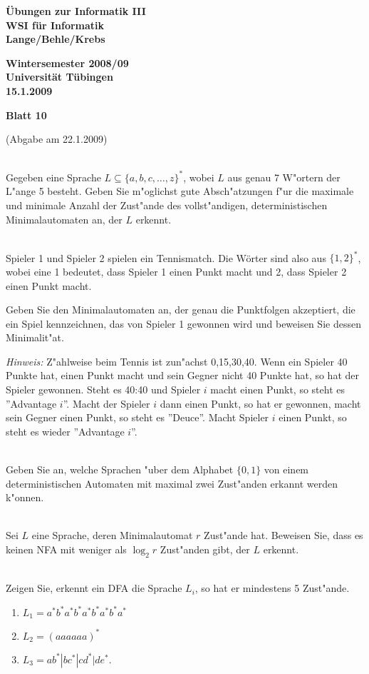 \documentclass[a4paper]{article}
\def\header#1#2#3{\pagestyle{empty}
\noindent
\begin{minipage}[t]{0.6\textwidth}
\begin{flushleft}
\bf \"Ubungen zur Informatik III\\
WSI f\"ur Informatik\\
Lange/Behle/Krebs
\end{flushleft}
\end{minipage}
\begin{minipage}[t]{0.4\textwidth}
\begin{flushright}
\bf Wintersemester 2008/09\\
Universit\"at T\"ubingen\\
#2 %
\end{flushright}
\end{minipage}

\begin{center}
{\Large\bf Blatt #1}

{(Abgabe am #3)}
\end{center}
\bigskip
}
\begin{document}
\header{10}{15.1.2009}{22.1.2009}

\bigskip
{}\\
Gegeben eine Sprache $L\subseteq\{a,b,c,\ldots,z\}^*$, wobei $L$ aus genau 7 W"ortern der L"ange 5 besteht. Geben Sie m"oglichst gute Absch"atzungen f"ur die maximale und minimale Anzahl der Zust"ande des vollst"andigen, deterministischen Minimalautomaten an, der $L$ erkennt.


\bigskip
{}\\
Spieler 1 und Spieler 2 spielen ein Tennismatch.
Die W\"orter sind also aus $\{1,2\}^*$, wobei eine 1 bedeutet, dass Spieler 1 einen Punkt macht und 2, dass Spieler 2 einen Punkt macht.

Geben Sie den Minimalautomaten an, der genau die Punktfolgen akzeptiert, die ein Spiel kennzeichnen, das von Spieler 1 gewonnen wird und beweisen Sie dessen Minimalit"at.

\bigskip
{\em Hinweis:} Z"ahlweise beim Tennis ist zun"achst 0,15,30,40. Wenn ein Spieler 40 Punkte hat, einen Punkt macht und sein Gegner nicht 40 Punkte hat, so hat der Spieler gewonnen. Steht es 40:40 und Spieler $i$ macht einen Punkt, so steht es ''Advantage $i$''. Macht der Spieler $i$ dann einen Punkt, so hat er gewonnen, macht sein Gegner einen Punkt, so steht es ''Deuce''. Macht Spieler $i$ einen Punkt, so steht es wieder ''Advantage $i$''.


\bigskip
{}\\
Geben Sie an, welche Sprachen "uber dem Alphabet $\{0,1\}$ von einem deterministischen Automaten mit maximal zwei Zust"anden erkannt werden k"onnen.

\bigskip
{}\\
Sei $L$ eine Sprache, deren Minimalautomat $r$ Zust"ande hat. Beweisen Sie, dass es keinen NFA mit weniger als $\log_2 r$ Zust"anden gibt, der $L$ erkennt.

\bigskip
{}\\
Zeigen Sie, erkennt ein DFA die Sprache $L_i$, so hat er mindestens 5 Zust"ande.
\begin{enumerate}
\item $L_1=a^*b^*a^*b^*a^*b^*a^*b^*a^*$
\item $L_2=(aaaaaa)^*$
\item $L_3=ab^*|bc^*|cd^*|de^*$.
\end{enumerate}
\end{document}
